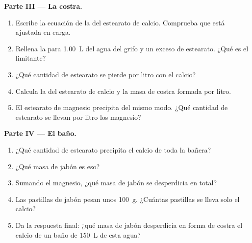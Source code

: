 \begin{problem}
\medskip
\noindent\textbf{Parte III --- La costra.}
\begin{enumerate}[resume]
  \item Escribe la ecuación de la  del estearato de calcio.
        Comprueba que está ajustada en carga.
  \item Rellena la  para \qty{1.00}{L} del agua del grifo
        y un exceso de  estearato. ¿Qué  es el limitante?
  \item ¿Qué cantidad de  estearato se pierde por litro con el
        calcio?
  \item Calcula la  del estearato de calcio y la masa de
        costra formada por litro.
  \item El estearato de magnesio precipita del mismo modo. ¿Qué cantidad
        de estearato se llevan por litro los  magnesio?
\end{enumerate}

\medskip
\noindent\textbf{Parte IV --- El baño.}
\begin{enumerate}[resume]
  \item ¿Qué cantidad de  estearato precipita el calcio de toda la
        bañera?
  \item ¿Qué masa de jabón es eso?
  \item Sumando el magnesio, ¿qué masa de jabón se desperdicia en
        total?
  \item Las pastillas de jabón pesan unos \qty{100}{g}. ¿Cuántas
        pastillas se lleva solo el calcio?
  \item Da la respuesta final: ¿qué masa de jabón desperdicia en forma
        de costra el calcio de un baño de \qty{150}{L} de esta agua?
\end{enumerate}
\end{problem}

